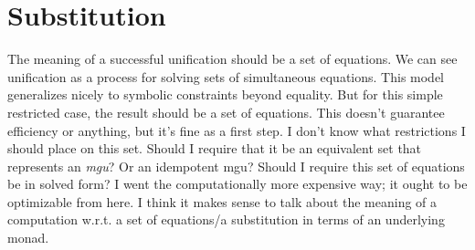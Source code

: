 \documentclass[11pt,twoside]{article}
\numberwithin{equation}{subsection} %
\begin{document}




\section{Substitution}

The meaning of a successful unification should be a set of
equations. We can see unification as a process for solving sets of
simultaneous equations. This model generalizes nicely to symbolic
constraints beyond equality. But for this simple restricted case, the
result should be a set of equations. This doesn't guarantee efficiency
or anything, but it's fine as a first step. I don't know what
restrictions I should place on this set. Should I require that it be
an equivalent set that represents an \emph{mgu}? Or an idempotent mgu?
Should I require this set of equations be in solved form? I went the
computationally more expensive way; it ought to be optimizable from
here. I think it makes sense to talk about the meaning of a
computation w.r.t. a set of equations/a substitution in terms of an
underlying monad.
\end{document}
